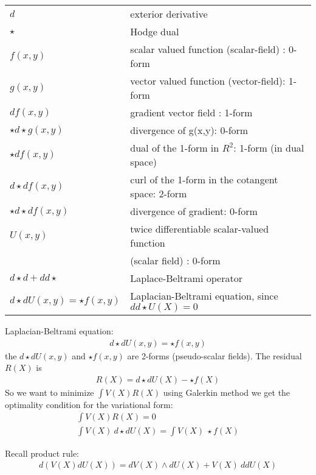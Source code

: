 \documentclass{birkjour}
\numberwithin{equation}{section}
\begin{document}
\newcommand{\hodge}{{\star}}

\begin{tabular}{l l}
	$d$ & exterior derivative\\
	$\hodge$ & Hodge dual\\
	$f(x,y)$ & scalar valued function (scalar-field) : 0-form\\
	$g(x,y)$ & vector valued function (vector-field): 1-form\\
	$df(x,y)$ & gradient vector field : 1-form\\
	$\hodge d \hodge g(x,y)$ & divergence  of  g(x,y): 0-form\\
	$\hodge df(x,y)$ & dual  of  the  1-form  in  $R^2$:  1-form (in dual space)\\
	$d \hodge df(x,y)$ & curl of the 1-form in the cotangent space: 2-form\\
	$\hodge d \hodge df(x,y)$ & divergence of gradient: 0-form\\
	$U(x,y)$ & twice differentiable scalar-valued function\\ & (scalar field) : 0-form\\
	$d \hodge d + d d \hodge$ & Laplace-Beltrami operator\\
	$d \hodge d U(x,y) = \hodge f(x, y)$ & Laplacian-Beltrami equation, since $dd\hodge U(X) = 0$ \\
\end{tabular}

Laplacian-Beltrami equation:
\begin{eqnarray} 
	d \hodge d U(x,y) = \hodge f(x, y) \nonumber
\end{eqnarray} 
the $d \hodge d U(x,y)$ and $\hodge f(x, y)$ are 2-forms (pseudo-scalar fields). The residual $R(X)$ is
\begin{eqnarray} 
	R(X) = d \hodge d U(X) - \hodge f(X) \nonumber
\end{eqnarray} 
So we want to minimize $\int V(X) R(X)$ using Galerkin method we get the optimality condition for the variational form:
\begin{eqnarray} 
\int V(X) R(X) = 0 \nonumber\\
\int V(X) \ d \hodge d U(X) = \int V(X) \ \hodge f(X) \nonumber
\end{eqnarray} 

Recall product rule:
\begin{eqnarray} 
	d \left( V(X) d U(X) \right) = d V(X) \wedge d U(X) + V(X) \ d d U(X) \nonumber
\end{eqnarray} 
	
\end{document}
